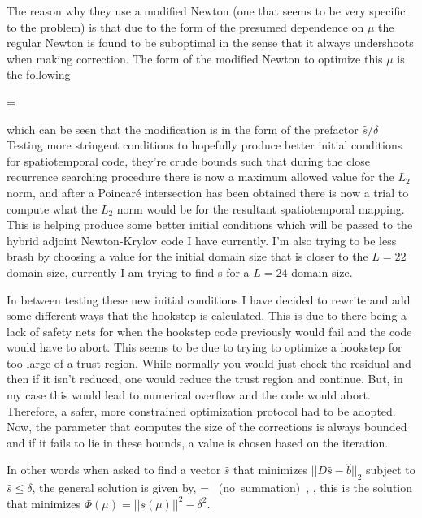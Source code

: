 The reason why they use a modified Newton (one that seems to be very specific to the problem) is that
due to the form of the presumed dependence on $\mu$ the regular Newton is found to be suboptimal in
the sense that it always undershoots when making correction. The form of the modified Newton to optimize
this $\mu$ is the following

\beq
\Delta \mu = 
\eeq

which can be seen that the modification is in the form of the prefactor $\hat{s} / \delta$
Testing more stringent conditions to hopefully produce better initial conditions for spatiotemporal
code, they're crude bounds such that during the close recurrence searching procedure there is now a maximum
allowed value for the $L_2$ norm, and after a Poincar\'e intersection has been obtained there is now
a trial to compute what the $L_2$ norm would be for the resultant spatiotemporal mapping. This is helping
produce some better initial conditions which will be passed to the hybrid adjoint Newton-Krylov code I have
currently. I'm also trying to be less brash by choosing a value for the initial domain size that is closer
to the $L=22$ domain size, currently I am trying to find \ppo s for a $L=24$ domain size.


In between testing these new initial conditions I have decided to rewrite
and add some different ways that the hookstep is calculated. This is due
to there being a lack of safety nets for when the hookstep code
previously would fail and the code would have to abort. This seems to be
due to trying to optimize a hookstep for too large of a trust region.
While normally you would just check the residual and then if it isn't
reduced, one would reduce the trust region and continue. But, in my case
this would lead to numerical overflow and the code would abort.
Therefore, a safer, more constrained optimization protocol had to be
adopted. Now, the parameter that computes the size of the corrections is
always bounded and if it fails to lie in these bounds, a value is chosen
based on the iteration.

In other words when asked to find a vector $\hat{s}$ that minimizes $||D
\hat{s} - \hat{b} ||_2 $ subject to $\hat{s} \leq \delta $, the general
solution is given by,
\beq \label{eqn:hookstep}
 =  \mbox{    (no summation)}
\,,
\eeq
\ie, this is the solution that minimizes $\Phi(\mu) = ||s(\mu)||^2 - \delta^2$.

